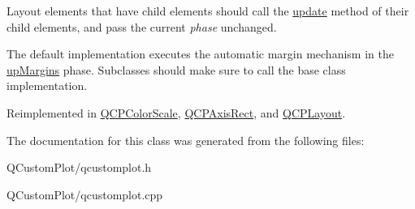 Layout elements that have child elements should call the \mbox{\hyperlink{class_q_c_p_layout_element_a929c2ec62e0e0e1d8418eaa802e2af9b}{update}} method of their child elements, and pass the current {\itshape phase} unchanged.

The default implementation executes the automatic margin mechanism in the \mbox{\hyperlink{class_q_c_p_layout_element_a0d83360e05735735aaf6d7983c56374da288cb59a92280e47261a341f2813e676}{up\+Margins}} phase. Subclasses should make sure to call the base class implementation. 

Reimplemented in \mbox{\hyperlink{class_q_c_p_color_scale_a259dcb6d3053a2cc3c197e9b1191ddbe}{Q\+C\+P\+Color\+Scale}}, \mbox{\hyperlink{class_q_c_p_axis_rect_add049d464b9ef2ccdc638adc4ccb4aca}{Q\+C\+P\+Axis\+Rect}}, and \mbox{\hyperlink{class_q_c_p_layout_a48ecc9c98ea90b547c3e27a931a8f7bd}{Q\+C\+P\+Layout}}.



The documentation for this class was generated from the following files\+:\begin{DoxyCompactItemize}
\item 
Q\+Custom\+Plot/qcustomplot.\+h\item 
Q\+Custom\+Plot/qcustomplot.\+cpp\end{DoxyCompactItemize}
